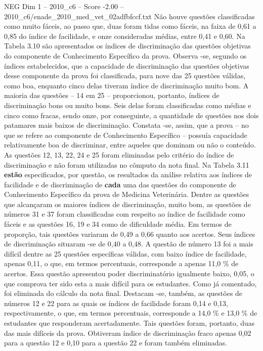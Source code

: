 \begin{textsample}{NEG Dim 1 – 2010\_c6 – Score -2.00 – 2010\_c6/enade\_2010\_med\_vet\_02adfbfccf.txt}
Não houve questões classificadas como muito fáceis, ao passo que, duas foram tidas como fáceis, na faixa de 0,61 a 0,85 do índice de facilidade, e onze consideradas médias, entre 0,41 e 0,60.
Na Tabela 3.10 são apresentados os índices de discriminação das questões objetivas do componente de Conhecimento Específico da prova.
Observa -se, segundo os índices estabelecidos, que a capacidade de discriminação das questões objetivas desse componente da prova foi classificada, para nove das 25 questões válidas, como boa, enquanto cinco delas tiveram índice de discriminação muito bom.
A maioria das questões – 14 em 25 – proporcionou, portanto, índices de discriminação bons ou muito bons.
Seis delas foram classificadas como médias e cinco como fracas, sendo onze, por conseguinte, a quantidade de questões nos dois patamares mais baixos de discriminação.
Constata -se, assim, que a prova – no que se refere ao componente de Conhecimento Específico – possuía capacidade relativamente boa de discriminar, entre aqueles que dominam ou não o conteúdo.
As questões 12, 13, 22, 24 e 25 foram eliminadas pelo critério do índice de discriminação e não foram utilizadas no cômputo da nota final.
Na Tabela 3.11 \textbf{estão} especificados, por questão, os resultados da análise relativa aos índices de facilidade e de discriminação de \textbf{cada} uma das questões do componente de Conhecimento Específico da prova de Medicina Veterinária.
Dentre as questões que alcançaram os maiores índices de discriminação, muito bom, as questões de números 31 e 37 foram classificadas com respeito ao índice de facilidade como fáceis e as questões 16, 19 e 34 como de dificuldade média.
Em termos de proporção, tais questões variaram de 0,49 a 0,66 quanto aos acertos.
Seus índices de discriminação situaram -se de 0,40 a 0,48.
A questão de número 13 foi a mais difícil dentre as 25 questões específicas válidas, com baixo índice de facilidade, apenas 0,11, o que, em termos percentuais, corresponde a apenas 11,0 \% de acertos.
Essa questão apresentou poder discriminatório igualmente baixo, 0,05, o que comprova ter sido esta a mais difícil para os estudantes.
Como já comentado, foi eliminada do cálculo da nota final.
Destacam -se, também, as questões de números 12 e 22 para as quais os índices de facilidade foram 0,14 e 0,13, respectivamente, o que, em termos percentuais, corresponde a 14,0 \% e 13,0 \% de estudantes que responderam acertadamente.
Tais questões foram, portanto, duas das mais difíceis da prova.
Obtiveram índice de discriminação fraco apenas 0,02 para a questão 12 e 0,10 para a questão 22 e foram também eliminadas.

\end{textsample}

